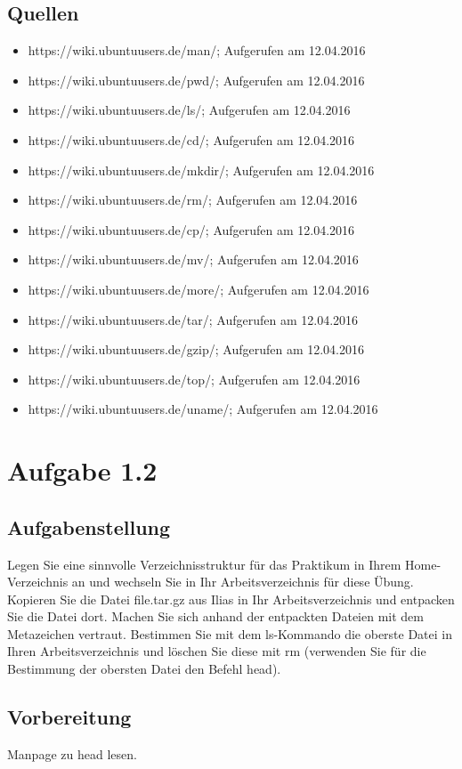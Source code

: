 	\subsection{Quellen}
		\begin{itemize}
			\item https://wiki.ubuntuusers.de/man/; Aufgerufen am 12.04.2016
			\item https://wiki.ubuntuusers.de/pwd/; Aufgerufen am 12.04.2016
			\item https://wiki.ubuntuusers.de/ls/; Aufgerufen am 12.04.2016
			\item https://wiki.ubuntuusers.de/cd/; Aufgerufen am 12.04.2016
			\item https://wiki.ubuntuusers.de/mkdir/; Aufgerufen am 12.04.2016
			\item https://wiki.ubuntuusers.de/rm/; Aufgerufen am 12.04.2016
			\item https://wiki.ubuntuusers.de/cp/; Aufgerufen am 12.04.2016
			\item https://wiki.ubuntuusers.de/mv/; Aufgerufen am 12.04.2016
			\item https://wiki.ubuntuusers.de/more/; Aufgerufen am 12.04.2016
			\item https://wiki.ubuntuusers.de/tar/; Aufgerufen am 12.04.2016
			\item https://wiki.ubuntuusers.de/gzip/; Aufgerufen am 12.04.2016
			\item https://wiki.ubuntuusers.de/top/; Aufgerufen am 12.04.2016
			\item https://wiki.ubuntuusers.de/uname/; Aufgerufen am 12.04.2016
		\end{itemize}
\section{Aufgabe 1.2}
	\subsection{Aufgabenstellung}
		Legen Sie eine sinnvolle Verzeichnisstruktur f\"ur das Praktikum in Ihrem Home-Verzeichnis an und wechseln Sie in Ihr Arbeitsverzeichnis f\"ur diese \"Ubung. Kopieren Sie die Datei file.tar.gz aus Ilias in Ihr Arbeitsverzeichnis und entpacken Sie die Datei dort. Machen Sie sich anhand der entpackten Dateien mit dem Metazeichen vertraut. Bestimmen Sie mit dem ls-Kommando die oberste Datei in Ihren Arbeitsverzeichnis und l\"oschen Sie diese mit rm (verwenden Sie f\"ur die Bestimmung der obersten Datei den Befehl head).
	\subsection{Vorbereitung}
		Manpage zu head lesen.
